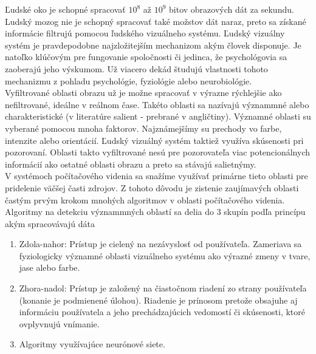 
Ľudské oko je schopné spracovať \begin{math}10^8\end{math} až \begin{math}10^9\end{math} bitov obrazových
dát za sekundu. Ludský mozog nie je schopný spracovať také možstov dát naraz,
preto sa získané informácie filtrujú pomocou ľudského vizuálneho systému\cite{Fmph-videnie}. Ľudský vizuálny systém
je pravdepodobne najzložitejším mechanizom akým človek disponuje. Je natoľko klúčovým pre fungovanie spoločnosti či jedinca, že
psychológovia sa zaoberajú jeho výskumom. Už viacero dekád študujú vlastnosti tohoto
mechanizmu z pohladu psychológie, fyziológie alebo neurobiológie.
\\
Vyfiltrované oblasti obrazu už je možne spracovať v výrazne rýchlejšie ako nefiltrované, ideálne v reálnom čase. Takéto oblasti sa nazívajú význammné alebo charakteristické (v literatúre salient - prebrané v angličtiny). Významné oblasti su vyberané pomocou mnoha faktorov. Najznámejšímy su prechody vo farbe, intenzite alebo orientácií. Ľudský vizuálný systém taktiež využíva skúsenosti pri pozorovaní. Oblasti takto vyfiltrované nesú pre pozorovateľa viac potencionálnych informácií ako ostatné oblasti obrazu a preto sa stávajú salietnýmy.
\\
V systémoch počítačového videnia sa snažíme využívať primárne tieto oblasti pre pridelenie väčšej časti zdrojov. Z tohoto dôvodu je zistenie zaujímavých oblasti častým prvým krokom mnohých algoritmov v oblasti počítačového videnia.
\\
Algoritmy na detekciu význammných oblastí sa delia do 3 skupín podľa princípu akým spracovávajú dáta\cite{brief-survey}

  \begin{enumerate}

          \item Zdola-nahor: Prístup je cielený na nezávyslosť od používateľa.
          Zameriava sa fyziologicky významné oblasti vizuálneho systému ako
          výrazné zmeny v tvare, jase alebo farbe.

          \item Zhora-nadol: Prístup je založený na čiastočnom riadení zo
          strany používateľa (konanie je podmienené úlohou). Riadenie je prínosom pretože obsajuhe aj informáciu
          používatela a jeho prechádzajúcich vedomostí či skúsenosti, ktoré ovplyvnujú vnímanie.

          \item Algoritmy využívajúce neurónové siete.

  \end{enumerate}


